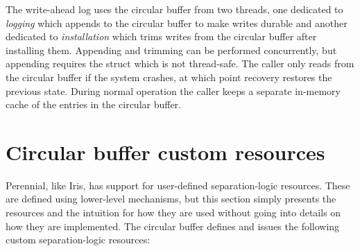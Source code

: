 The write-ahead log uses the circular buffer from two threads, one dedicated to
\emph{logging} which appends to the circular buffer to make writes durable and another
dedicated to \emph{installation} which trims writes from the circular buffer
after installing them. Appending and trimming can be performed concurrently, but
appending requires the  struct which is not thread-safe. The
caller only reads from the circular buffer if the system crashes, at which point
recovery restores the previous state. During normal operation the caller keeps a
separate in-memory cache of the entries in the circular buffer.

\section{Circular buffer custom resources}

Perennial, like Iris, has support for user-defined separation-logic resources.
These are defined using lower-level mechanisms, but this section simply presents the
resources and the intuition for how they are used without going into details on
how they are implemented. The circular buffer defines and issues the
following custom separation-logic resources:

\newcommand{\circstate}{\cc{circ_state}}
\newcommand{\startIs}{\cc{start_is}}
\newcommand{\diskendIs}{\cc{end_is}}

